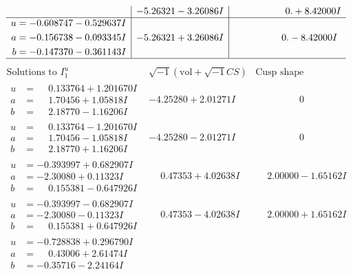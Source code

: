 \documentclass[1p]{elsarticle_modified}
\theoremstyle{definition}
\newcommand{\I}{\sqrt{-1}}
\begin{document}
$$\begin{array}{c|c|c}
 & -5.26321 - 3.26086 I & \phantom{-0.000000 -}0. + 8.42000 I \\ \hline\begin{aligned}
u &= -0.608747 - 0.529637 I \\
a &= -0.156738 - 0.093345 I \\
b &= -0.147370 - 0.361143 I\end{aligned}
 & -5.26321 + 3.26086 I & \phantom{-0.000000 } 0. - 8.42000 I\\
 \hline 
 \end{array}$$\newpage$$\begin{array}{c|c|c}  
\text{Solutions to }I^u_{1}& \I (\text{vol} + \sqrt{-1}CS) & \text{Cusp shape}\\
 \hline 
\begin{aligned}
u &= \phantom{-}0.133764 + 1.201670 I \\
a &= \phantom{-}1.70456 + 1.05818 I \\
b &= \phantom{-}2.18770 - 1.16206 I\end{aligned}
 & -4.25280 + 2.01271 I & \phantom{-0.000000 } 0 \\ \hline\begin{aligned}
u &= \phantom{-}0.133764 - 1.201670 I \\
a &= \phantom{-}1.70456 - 1.05818 I \\
b &= \phantom{-}2.18770 + 1.16206 I\end{aligned}
 & -4.25280 - 2.01271 I & \phantom{-0.000000 } 0 \\ \hline\begin{aligned}
u &= -0.393997 + 0.682907 I \\
a &= -2.30080 + 0.11323 I \\
b &= \phantom{-}0.155381 - 0.647926 I\end{aligned}
 & \phantom{-}0.47353 + 4.02638 I & \phantom{-}2.00000 - 1.65162 I \\ \hline\begin{aligned}
u &= -0.393997 - 0.682907 I \\
a &= -2.30080 - 0.11323 I \\
b &= \phantom{-}0.155381 + 0.647926 I\end{aligned}
 & \phantom{-}0.47353 - 4.02638 I & \phantom{-}2.00000 + 1.65162 I \\ \hline\begin{aligned}
u &= -0.728838 + 0.296790 I \\
a &= \phantom{-}0.43006 + 2.61474 I \\
b &= -0.35716 - 2.24164 I\end{aligned}

\end{array}$$
\end{document}
